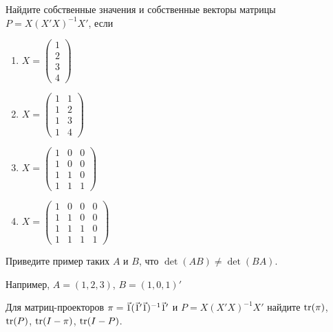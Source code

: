 \documentclass[pdftex,11pt,openany]{book}\usepackage[]{graphicx}\usepackage[]{color}
\begin{document}
\begin{solution}
\end{solution}


\begin{problem}
Найдите собственные значения и собственные векторы матрицы $P = X(X'X)^{-1}X'$, если 

\begin{enumerate}


\item $X = \begin{pmatrix} 1 \\ 2 \\ 3 \\ 4 \end{pmatrix}$


\item $X = \begin{pmatrix} 1 & 1 \\ 1 & 2 \\ 1 & 3 \\ 1 & 4 \end{pmatrix}$


\item $X = \begin{pmatrix} 1 & 0 & 0 \\ 1 & 0 & 0 \\ 1 & 1 & 0  \\ 1 & 1 & 1 \end{pmatrix}$


\item $X = \begin{pmatrix} 1 & 0 & 0 & 0 \\ 1 & 1 & 0 & 0 \\ 1 & 1 & 1 & 0  \\ 1 & 1 & 1 & 1 \end{pmatrix}$
\end{enumerate}
\end{problem}

\begin{solution}
\end{solution}

\begin{problem}
Приведите пример таких $A$ и $B$, что $\det(AB)\neq \det(BA)$.
\end{problem}

\begin{solution}
Например, $A=(1,2,3)$, $B=(1,0,1)'$
\end{solution}

\begin{problem}
Для матриц-проекторов $\pi=\v1(\v1'\v1)^{-1}\v1'$ и $P=X(X'X)^{-1}X'$ найдите $\operatorname{tr}(\pi)$, $\operatorname{tr}(P)$, $\operatorname{tr}(I-\pi)$, $\operatorname{tr}(I-P)$.
\end{problem}
\end{document}
